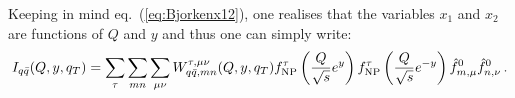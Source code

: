 \documentclass[10pt,a4paper]{article}
\begin{document}



Keeping in mind eq.~(\ref{eq:Bjorkenx12}), one realises that the
variables $x_1$ and $x_2$ are functions of $Q$ and $y$ and thus one
can simply write:
\begin{equation}\label{eq:finalres}
  I_{q\bar{q}}(Q, y, q_T) =
  \sum_\tau \sum_{mn}\sum_{\mu\nu} W_{q\bar{q},mn}^{\tau,\mu\nu}(Q,y,q_T) f_{\rm NP}^\tau\left(\frac{Q}{\sqrt{s}}e^{y}\right) f_{\rm NP}^\tau\left(\frac{Q}{\sqrt{s}}e^{-y}\right)\hat{f}_{m,\mu}^0 \hat{f}_{n,\nu}^0\,.
\end{equation}
\end{document}
